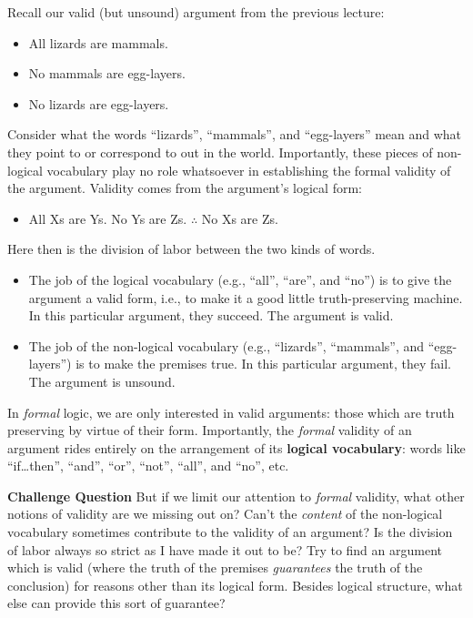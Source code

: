 \documentclass[options]{philosophersimprint}
\theoremstyle{definition}
\begin{document}
Recall our valid (but unsound) argument from the previous lecture:
\begin{itemize}
    \item[] All lizards are mammals.
    \item[] No mammals are egg-layers.
    \item[$\therefore$] No lizards are egg-layers.
\end{itemize}
Consider what the words ``lizards'', ``mammals'', and ``egg-layers'' mean and what they point to or correspond to out in the world. Importantly, these pieces of non-logical vocabulary play no role whatsoever in establishing the formal validity of the argument. Validity comes from the argument's logical form:
\begin{itemize}
    \item[] All Xs are Ys. \qquad No Ys are Zs. \qquad $\therefore$ No Xs are Zs.
\end{itemize}
Here then is the division of labor between the two kinds of words.
\begin{itemize}
    \item[$\bullet$] The job of the logical vocabulary (e.g., ``all'', ``are'', and ``no'') is to give the argument a valid form, i.e., to make it a good little truth-preserving machine. In this particular argument, they succeed. The argument is valid.
    \item[$\bullet$] The job of the non-logical vocabulary (e.g., ``lizards'', ``mammals'', and ``egg-layers'') is to make the premises true. In this particular argument, they fail. The argument is unsound.
\end{itemize}

In \textit{formal} logic, we are only interested in valid arguments: those which are truth preserving by virtue of their form. Importantly, the \textit{formal} validity of an argument rides entirely on the arrangement of its \textbf{logical vocabulary}: words like ``if\ldots then'', ``and'', ``or'', ``not'', ``all'', and ``no'', etc.

\textbf{Challenge Question} But if we limit our attention to \textit{formal} validity, what other notions of validity are we missing out on? Can't the \textit{content} of the non-logical vocabulary sometimes contribute to the validity of an argument? Is the division of labor always so strict as I have made it out to be? Try to find an argument which is valid (where the truth of the premises \textit{guarantees} the truth of the conclusion) for reasons other than its logical form. Besides logical structure, what else can provide this sort of guarantee?
\end{document}
